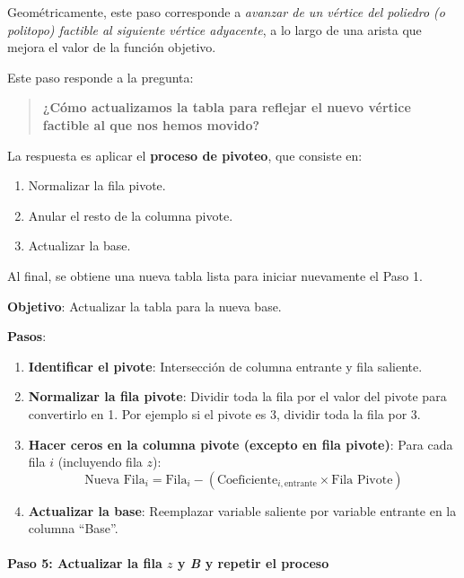 Geométricamente, este paso corresponde a \textit{avanzar de un vértice del
poliedro (o politopo) factible al siguiente vértice adyacente}, a lo largo de una arista
que mejora el valor de la función objetivo.

Este paso responde a la pregunta:
\begin{quote}
  \textbf{¿Cómo actualizamos la tabla para reflejar el nuevo vértice factible
  al que nos hemos movido?}
\end{quote}

La respuesta es aplicar el \textbf{proceso de pivoteo}, que consiste en:
\begin{enumerate}
  \item Normalizar la fila pivote.
  \item Anular el resto de la columna pivote.
  \item Actualizar la base.
\end{enumerate}

Al final, se obtiene una nueva tabla lista para iniciar nuevamente el Paso 1.

\begin{tcolorbox}[title=Resumen del paso 4]
  \noindent \textbf{Objetivo}: Actualizar la tabla para la nueva base.
  
  \noindent \textbf{Pasos}:
  \begin{enumerate}
    \item \textbf{Identificar el pivote}: Intersección de columna entrante y fila saliente.
    \item \textbf{Normalizar la fila pivote}: Dividir toda la fila por el valor del pivote para convertirlo en 1. Por ejemplo si el pivote es 3, dividir toda la fila por 3.
    \item \textbf{Hacer ceros en la columna pivote (excepto en fila pivote)}: Para cada fila \(i\) (incluyendo fila \(z\)):
       \[
       \text{Nueva Fila}_i = \text{Fila}_i - (\text{Coeficiente}_{i,\text{entrante}} \times \text{Fila Pivote})
       \]
    \item \textbf{Actualizar la base}: Reemplazar variable saliente por variable entrante en la columna ``Base''.
  \end{enumerate}
\end{tcolorbox}

\paragraph{Paso 5: Actualizar la fila \(z\) y \textit{B} y repetir el proceso}


